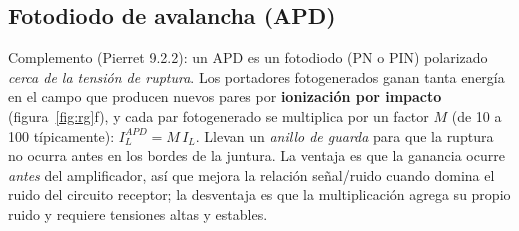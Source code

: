 \subsection{Fotodiodo de avalancha (APD)}
\label{sec:apd}

Complemento (Pierret 9.2.2): un APD es un fotodiodo (PN o PIN) polarizado \emph{cerca de la
tensión de ruptura}. Los portadores fotogenerados ganan tanta energía en el campo que
producen nuevos pares por \textbf{ionización por impacto} (figura~\ref{fig:rg}f), y cada
par fotogenerado se multiplica por un factor $M$ (de 10 a 100 típicamente):
$I_L^{APD}=M\,I_L$. Llevan un \emph{anillo de guarda} para que la ruptura no ocurra antes
en los bordes de la juntura. La ventaja es que la ganancia ocurre \emph{antes} del
amplificador, así que mejora la relación señal/ruido cuando domina el ruido del circuito
receptor; la desventaja es que la multiplicación agrega su propio ruido y requiere
tensiones altas y estables.
